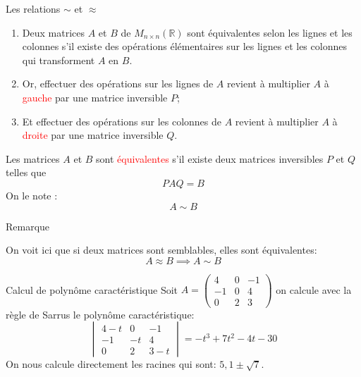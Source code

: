 \begin{parag}{Les relations $\sim$ et $\approx$}

    \begin{enumerate}
        \item Deux matrices $A$ et $B$ de $M_{n \times n}(\mathbb{R})$ sont équivalentes selon les lignes et les colonnes s'il existe des opérations élémentaires sur les lignes et les colonnes qui transforment $A$ en $B$.
        \item Or, effectuer des opérations sur les lignes de $A$ revient à multiplier $A$ à \textcolor{red}{gauche} par une matrice inversible $P$;
        \item Et effectuer des opérations sur les colonnes de $A$ revient à multiplier $A$ à \textcolor{red}{droite} par une matrice inversible $Q$.
    \end{enumerate}
    \begin{definition}
        Les matrices $A$ et $B$ sont \textcolor{red}{équivalentes} s'il existe deux matrices inversibles $P$ et $Q$ telles que 
        \[PAQ = B\]
        On le note :
        \[A \sim B\]
    \end{definition}
    \begin{subparag}{Remarque}
        \begin{framedremark}
            On voit ici que si deux matrices sont semblables, elles sont équivalentes:
            \[A \approx B \implies A \sim B\]
        \end{framedremark}
    \end{subparag}
\end{parag}
\begin{parag}{Calcul de polynôme caractéristique}
    Soit $A = \begin{pmatrix}
        4 & 0 & -1\\
        -1 & 0 & 4 \\
        0 & 2 & 3
    \end{pmatrix}$ on calcule avec la règle de Sarrus le polynôme caractéristique:
\[\begin{vmatrix}
    4-t & 0 & -1\\
    -1 &-t & 4\\
    0 & 2 & 3-t
\end{vmatrix} = -t^3 + 7t^2 -4t -30\]
On nous calcule directement les racines qui sont: $5, 1 \pm \sqrt{7}$.
\end{parag}


